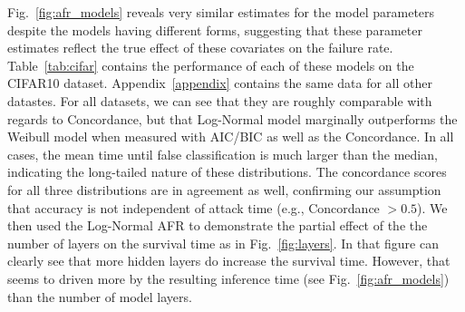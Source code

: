 Fig.~\ref{fig:afr_models} reveals very similar estimates for the model parameters despite the models having different forms, suggesting that these parameter estimates reflect the true effect of these covariates on the failure rate. Table~\ref{tab:cifar} contains the performance of each of these models on the CIFAR10 dataset.  Appendix~\ref{appendix} contains the same data for all other datastes. For all datasets, we can see that they are roughly comparable with regards to Concordance, but that Log-Normal model marginally outperforms the Weibull model when measured with AIC/BIC as well as the Concordance.
In all cases, the mean time until false classification is much larger than the median, indicating the long-tailed nature of these distributions.
The concordance scores for all three distributions are in agreement as well, confirming our assumption that accuracy is not independent of attack time (e.g., Concordance $> 0.5$).
We then used the Log-Normal AFR to demonstrate the partial effect of the the number of layers on the survival time as in Fig.~\ref{fig:layers}. In that figure can clearly see that more hidden layers do increase the survival time. However, that seems to driven more by the resulting inference time (see Fig.~\ref{fig:afr_models}) than the number of model layers.
